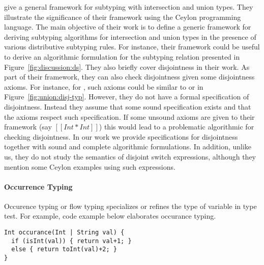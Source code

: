 \citet{muehlboeck2018empowering} give a general framework for subtyping
with intersection and union types. They illustrate the significance of
their framework using the Ceylon programming language.
The main objective of their work is to define a generic framework for
deriving subtyping algorithms for  
intersection and union types in the presence of various distributive subtyping rules.
For instance, their framework could be useful to derive an algorithmic
formulation for the subtyping relation presented in Figure~\ref{fig:discussion:ds}.
They also briefly cover disjointness in their work. As part of their framework, they
can also check disjointness given some disjointness axioms. For instance,
for \name, such axioms could be similar to  or 
in Figure~\ref{fig:union:disj-typ}. 
However, they do not have a formal
specification of disjointness. Instead they assume that some sound specification
exists and that the axioms respect such specification.
If some unsound axioms are given to their framework (say $[[Int * Int]]$) this
would lead to a problematic algorithmic for checking disjointness.
In our work we provide specifications for disjointness together
with sound and complete algorithmic formulations.
In addition, unlike us,
they do not study the semantics of disjoint switch expressions,
although they mention some Ceylon examples using such expressions.

\paragraph{Occurrence Typing}
Occurence typing or flow typing \cite{tobin2008design} specializes or refines 
the type of variable in type test. For example, code example below elaborates occurance typing.

\begin{lstlisting}
Int occurance(Int | String val) {
  if (isInt(val)) { return val+1; }
  else { return toInt(val)+2; }
}
\end{lstlisting}

